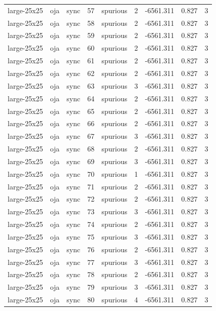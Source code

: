 \begin{tabular}{lllrlrrrr}
large-25x25 & oja & sync & 57 & spurious & 2 & -6561.311 & 0.827 & 3 \\
large-25x25 & oja & sync & 58 & spurious & 2 & -6561.311 & 0.827 & 3 \\
large-25x25 & oja & sync & 59 & spurious & 2 & -6561.311 & 0.827 & 3 \\
large-25x25 & oja & sync & 60 & spurious & 2 & -6561.311 & 0.827 & 3 \\
large-25x25 & oja & sync & 61 & spurious & 2 & -6561.311 & 0.827 & 3 \\
large-25x25 & oja & sync & 62 & spurious & 2 & -6561.311 & 0.827 & 3 \\
large-25x25 & oja & sync & 63 & spurious & 3 & -6561.311 & 0.827 & 3 \\
large-25x25 & oja & sync & 64 & spurious & 2 & -6561.311 & 0.827 & 3 \\
large-25x25 & oja & sync & 65 & spurious & 2 & -6561.311 & 0.827 & 3 \\
large-25x25 & oja & sync & 66 & spurious & 2 & -6561.311 & 0.827 & 3 \\
large-25x25 & oja & sync & 67 & spurious & 3 & -6561.311 & 0.827 & 3 \\
large-25x25 & oja & sync & 68 & spurious & 2 & -6561.311 & 0.827 & 3 \\
large-25x25 & oja & sync & 69 & spurious & 3 & -6561.311 & 0.827 & 3 \\
large-25x25 & oja & sync & 70 & spurious & 1 & -6561.311 & 0.827 & 3 \\
large-25x25 & oja & sync & 71 & spurious & 2 & -6561.311 & 0.827 & 3 \\
large-25x25 & oja & sync & 72 & spurious & 2 & -6561.311 & 0.827 & 3 \\
large-25x25 & oja & sync & 73 & spurious & 3 & -6561.311 & 0.827 & 3 \\
large-25x25 & oja & sync & 74 & spurious & 2 & -6561.311 & 0.827 & 3 \\
large-25x25 & oja & sync & 75 & spurious & 3 & -6561.311 & 0.827 & 3 \\
large-25x25 & oja & sync & 76 & spurious & 2 & -6561.311 & 0.827 & 3 \\
large-25x25 & oja & sync & 77 & spurious & 3 & -6561.311 & 0.827 & 3 \\
large-25x25 & oja & sync & 78 & spurious & 2 & -6561.311 & 0.827 & 3 \\
large-25x25 & oja & sync & 79 & spurious & 3 & -6561.311 & 0.827 & 3 \\
large-25x25 & oja & sync & 80 & spurious & 4 & -6561.311 & 0.827 & 3 \\

\end{tabular}
